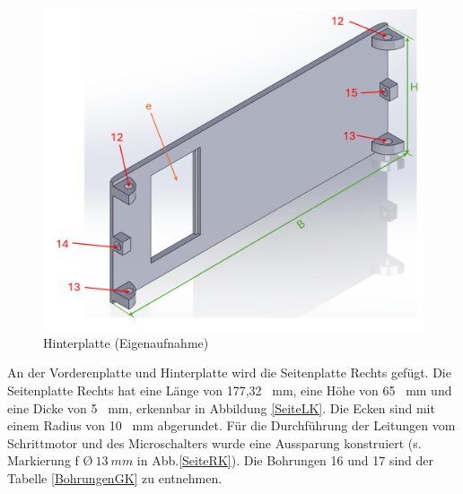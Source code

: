 \begin{figure}[H]
	\begin{center}
		\includegraphics[width=\textwidth]{Images/Konstruktion/HinterK.png}
		\caption{Hinterplatte (Eigenaufnahme)} \label{HinterK}
	\end{center}
\end{figure}

An der Vorderenplatte und Hinterplatte wird die Seitenplatte Rechts gefügt. Die Seitenplatte Rechts hat eine Länge von 177,32 \ mm, eine Höhe von 65 \ mm und eine Dicke von 5 \ mm, erkennbar in Abbildung \ref{SeiteLK}. Die Ecken sind mit einem Radius von 10 \ mm abgerundet. Für die Durchführung der Leitungen vom Schrittmotor und des Microschalters wurde eine Aussparung konstruiert (s. Markierung f \O $ \ 13 \ mm$  in Abb.\ref{SeiteRK}). Die Bohrungen 16 und 17 sind der Tabelle \ref{BohrungenGK} zu entnehmen. 


